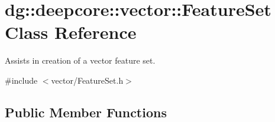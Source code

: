 \hypertarget{classdg_1_1deepcore_1_1vector_1_1_feature_set}{}\section{dg\+:\+:deepcore\+:\+:vector\+:\+:Feature\+Set Class Reference}
\label{classdg_1_1deepcore_1_1vector_1_1_feature_set}


Assists in creation of a vector feature set.  




{\ttfamily \#include $<$vector/\+Feature\+Set.\+h$>$}

\subsection*{Public Member Functions}
